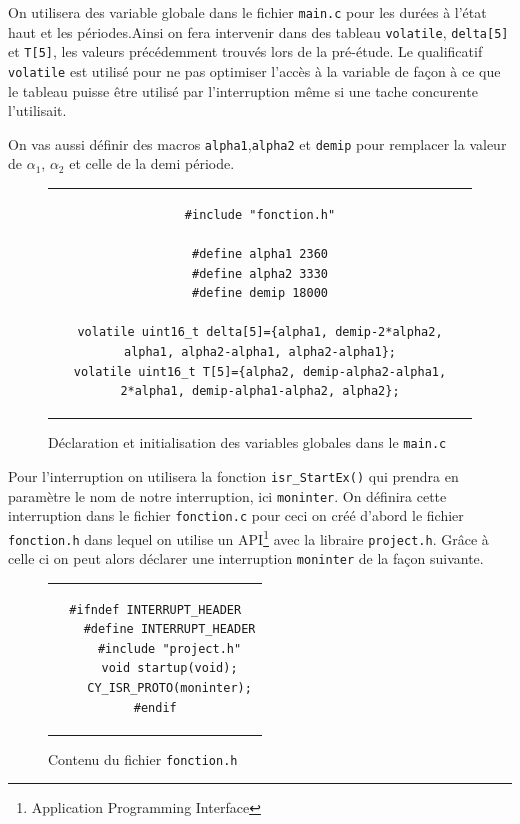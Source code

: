 \documentclass[11pt, openright]{book}
\begin{document}
On utilisera des variable globale dans le fichier \texttt{main.c} pour les durées à l'état haut et les périodes.Ainsi on fera intervenir dans des tableau \texttt{volatile}, \texttt{delta[5]} et \texttt{T[5]}, les valeurs précédemment trouvés lors de la pré-étude. Le qualificatif \texttt{volatile} est utilisé pour ne pas optimiser l'accès à la variable de façon à ce que le tableau puisse être utilisé par l'interruption même si une tache concurente l'utilisait.

On vas aussi définir des macros \texttt{alpha1},\texttt{alpha2} et \texttt{demip} pour remplacer la valeur de $\alpha_1$, $\alpha_2$ et celle de la demi période.

\begin{figure}[ht!]
	\centering
	\begin{tabular}{c}
		\begin{lstlisting}
#include "fonction.h"
			
#define alpha1 2360
#define alpha2 3330
#define demip 18000

volatile uint16_t delta[5]={alpha1, demip-2*alpha2, alpha1, alpha2-alpha1, alpha2-alpha1};
volatile uint16_t T[5]={alpha2, demip-alpha2-alpha1, 2*alpha1, demip-alpha1-alpha2, alpha2};
			\end{lstlisting}
	\end{tabular}
	\caption{Déclaration et initialisation des variables globales dans le \texttt{main.c}}
\end{figure}

Pour l'interruption on utilisera la fonction \texttt{isr\_StartEx()} qui prendra en paramètre le nom de notre interruption, ici \texttt{moninter}. On définira cette interruption dans le fichier \texttt{fonction.c} pour ceci on créé d'abord le fichier \texttt{fonction.h} dans lequel on utilise un API\footnote{Application Programming Interface} avec la libraire \texttt{project.h}. Grâce à celle ci on peut alors déclarer une interruption \texttt{moninter} de la façon suivante.

\begin{figure}[ht!]
	\centering
	\begin{tabular}{c}
		\begin{lstlisting}
#ifndef INTERRUPT_HEADER
	#define INTERRUPT_HEADER
	#include "project.h"
	void startup(void);
	CY_ISR_PROTO(moninter);
#endif
			\end{lstlisting}
	\end{tabular}
	\caption{Contenu du fichier \texttt{fonction.h}}
\end{figure}
\end{document}

